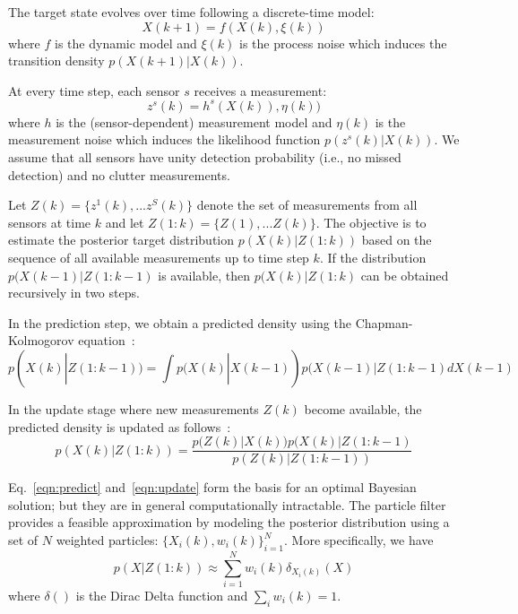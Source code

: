 \documentclass[10pt,letterpaper,final]{article}
\begin{document}
The target state evolves over time following a discrete-time model:
\begin{equation}
X(k+1) = f(X(k),\xi(k))
\label{eqn:dynamic_model}
\end{equation}
where $f$ is the dynamic model and $\xi(k)$ is the process noise which induces the transition density $p(X(k+1)|X(k))$. 

At every time step, each sensor $s$ receives a measurement:
\begin{equation}
z^s(k) = h^s(X(k)),\eta(k))
\end{equation}
where $h$ is the (sensor-dependent) measurement model and $\eta(k)$ is the measurement noise which induces the likelihood function $p(z^s(k)|X(k))$. We assume that all sensors have unity detection probability (i.e., no missed detection) and no clutter measurements. %

Let $Z(k)=\{z^1(k),...z^S(k)\}$ denote the set of measurements from all sensors at time $k$ and let $Z(1:k)=\{Z(1),...Z(k)\}$. The objective is to estimate the posterior target distribution $p(X(k)|Z(1:k))$ based on the sequence of all available measurements up to time step $k$. If the distribution $p(X(k-1)|Z(1:k-1)$ is available, then $p(X(k)|Z(1:k)$ can be obtained recursively in two steps. 
 
In the prediction step, we obtain a predicted density using the Chapman-Kolmogorov equation~\cite{Ristic2003}:
\begin{equation}
p(X(k)|Z(1:k-1))= \int p(X(k)|X(k-1))p(X(k-1)|Z(1:k-1)dX(k-1)
\label{eqn:predict}
\end{equation}

In the update stage where new measurements $Z(k)$ become available, the predicted density is updated as follows~\cite{Ristic2003}:
\begin{equation}
p(X(k)|Z(1:k))=\frac{p(Z(k)|X(k))p(X(k)|Z(1:k-1)}{p(Z(k)|Z(1:k-1))}
\label{eqn:update}
\end{equation}

Eq.~\eqref{eqn:predict} and~\eqref{eqn:update} form the basis for an optimal Bayesian solution; but they are in general computationally intractable. The particle filter provides a feasible approximation by modeling the posterior distribution using a set of $N$ weighted particles: $\{ X_i(k), w_i(k) \}_{i=1}^N$. More specifically, we have
\begin{equation}
p(X|Z(1:k)) \approx \sum_{i=1}^N w_i(k)\delta_{X_i(k)}(X)
\end{equation}
where $\delta()$ is the Dirac Delta function and $\sum_i w_i(k) = 1$. 
\end{document}
